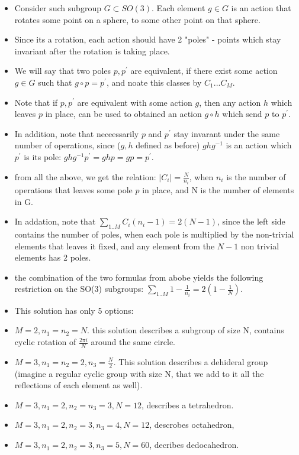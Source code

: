 \documentclass{article}
\begin{document}
\begin{itemize}
\item Consider such subgroup $G \subset SO(3)$. Each element $g \in G$ is an action that rotates some point on a sphere, to some other point on that sphere. 
\item Since its a rotation, each action should have 2 "poles" - points which stay invariant after the rotation is taking place.
\item We will say that two poles $p, p^{'}$ are equivalent, if there exist some action $g \in G$ such that $g \circ p = p^{'}$, and noate this classes by $C_{1}...C_{M}$.
\item Note that if $p, p^{'}$ are equivalent with some action $g$, then any action $h$ which leaves $p$ in place, can be used to obtained an action $g \circ h$ which send $p$ to $p^{'}$.
\item In addition, note that neceessarily $p$ and $p^{'}$ stay invarant under the same number of operations, since ($g, h$ defined as before) $ghg^{-1}$ is an action which $p^{'}$ is its pole: $ghg^{-1}p^{'} = ghp =gp = p^{'}$.
\item from all the above, we get the relation: $|C_{i}| = \frac{N}{n_{i}}$, when $n_{i}$ is the number of operations that leaves some pole $p$ in place, and N is the number of elements in G.

\item In addation, note that $\sum\limits_{1..M}{C_{i}(n_{i} -1)} = 2(N-1)$, since the left side contains the number of poles, when each pole is multiplied by the non-trivial elements that leaves it fixed, and any element from the $N-1$ non trivial elements has 2 poles.

\item the combination of the two formulas from abobe yields the following restriction on the SO(3) subgroups: $\sum\limits_{1..M}{1 - \frac{1}{n_{i}}} = 2(1-\frac{1}{N})$.

\item This solution has only 5 options:
\item $M=2, n_{1}=n_{2}=N$. this solution describes a subgroup of size N, contains cyclic rotation of $\frac{2{\pi}i}{N}$ around the same circle.
\item $M=3, n_{1}=n_{2}=2, n_{3}=\frac{N}{2}$. This solution describes a dehideral group (imagine a regular cyclic group with size N, that we add to it all the reflections of each element as well).
\item $M=3, n_{1}=2, n_{2}=n_{3}=3, N=12$, describes a tetrahedron.
\item $M=3, n_{1}=2,n_{2}=3, n_{3}=4, N=12$, descrobes octahedron,
\item $M=3, n_{1}=2, n_{2}=3, n_{3}=5, N=60$, decribes dedocahedron.
\end{itemize}
\end{document}
